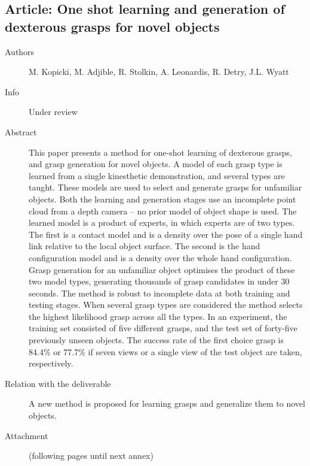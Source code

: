 \documentclass[a4paper,11pt,pdf]{pacmanreport}
\begin{document}
\subsection{Article: One shot learning and generation of dexterous grasps for novel objects} \label{ann:novelObjects}
\begin{description}
    \item[Authors] M. Kopicki, M. Adjible, R. Stolkin, A. Leonardis, R. Detry, J.L. Wyatt
    \item[Info] Under review
    \item[Abstract] This paper presents a method for one-shot learning of dexterous grasps, and grasp generation for novel objects. A model of each grasp type is learned from a single kinesthetic demonstration, and several types are taught. These models are used to select and generate grasps for unfamiliar objects. Both the learning and generation stages use an incomplete point cloud from a depth camera – no prior model of object shape is used. The learned model is a product of experts, in which experts are of two types. The first is a contact model and is a density over the pose of a single hand link relative to the local object surface. The second is the hand configuration model and is a density over the whole hand configuration. Grasp generation for an unfamiliar object optimises the product of these two model types, generating thousands of grasp candidates in under 30 seconds. The method is robust to incomplete data at both training and testing stages. When several grasp types are considered the method selects the highest likelihood grasp across all the types. In an experiment, the training set consisted  of five different grasps, and the test set of forty-five previously unseen objects. The success rate of the first choice grasp is 84.4\% or 77.7\% if seven views or a single view of the test object are taken, respectively.
    \item[Relation with the deliverable] A new method is proposed for learning grasps and generalize them to novel objects.
    \item[Attachment] (following pages until next annex)
\end{description}

\end{document}
